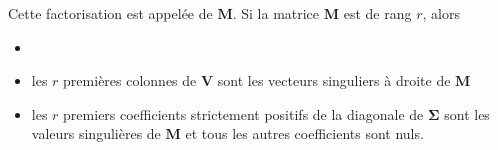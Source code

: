 \documentclass[letterpaper,11pt,english]{sphinxmanual}
\begin{document}
\sphinxAtStartPar
Cette factorisation est appelée  de \(\mathbf{M}\).  Si la matrice
\(\mathbf{M}\) est de rang \(r\), alors
\begin{itemize}
\item {} 

\item {} 
\sphinxAtStartPar
les \(r\) premières colonnes de \(\mathbf{V}\) sont les
vecteurs singuliers à droite de \(\mathbf{M}\)

\item {} 
\sphinxAtStartPar
les \(r\) premiers coefficients strictement positifs de la
diagonale de \(\mathbf{\Sigma}\) sont les valeurs singulières de
\(\mathbf{M}\) et tous les autres coefficients sont nuls.

\end{itemize}
\end{document}
